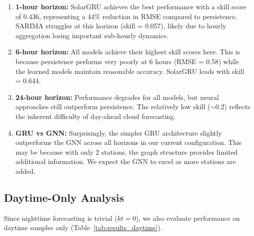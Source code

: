 \documentclass[11pt,a4paper]{article}
\begin{document}
\begin{enumerate}
    \item \textbf{1-hour horizon:} SolarGRU achieves the best performance with a skill score of 0.436, representing a 44\% reduction in RMSE compared to persistence. SARIMA struggles at this horizon (skill = 0.057), likely due to hourly aggregation losing important sub-hourly dynamics.
    
    \item \textbf{6-hour horizon:} All models achieve their highest skill scores here. This is because persistence performs very poorly at 6 hours (RMSE = 0.58) while the learned models maintain reasonable accuracy. SolarGRU leads with skill = 0.644.
    
    \item \textbf{24-hour horizon:} Performance degrades for all models, but neural approaches still outperform persistence. The relatively low skill ($\sim$0.2) reflects the inherent difficulty of day-ahead cloud forecasting.
    
    \item \textbf{GRU vs GNN:} Surprisingly, the simpler GRU architecture slightly outperforms the GNN across all horizons in our current configuration. This may be because with only 2 stations, the graph structure provides limited additional information. We expect the GNN to excel as more stations are added.
\end{enumerate}

\subsection{Daytime-Only Analysis}

Since nighttime forecasting is trivial ($kt = 0$), we also evaluate performance on daytime samples only (Table~\ref{tab:results_daytime}).
\end{document}
